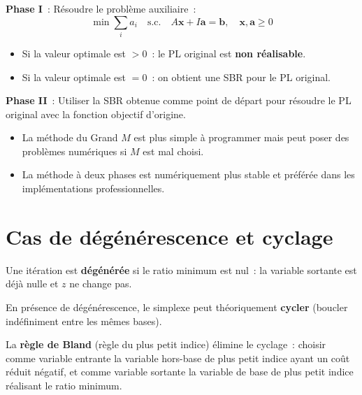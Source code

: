 \begin{algorithme}[title=\textbf{M\'ethode \`a deux phases}]
\textbf{Phase I}~: R\'esoudre le probl\`eme auxiliaire~:
\[
  \min \sum_{i} a_i \quad \text{s.c.} \quad
  A\mathbf{x} + I\mathbf{a} = \mathbf{b}, \quad
  \mathbf{x}, \mathbf{a} \ge 0
\]
\begin{itemize}
  \item Si la valeur optimale est $> 0$~: le PL original est \textbf{non
        r\'ealisable}.
  \item Si la valeur optimale est $= 0$~: on obtient une SBR pour le PL
        original.
\end{itemize}

\textbf{Phase II}~: Utiliser la SBR obtenue comme point de d\'epart pour
r\'esoudre le PL original avec la fonction objectif d'origine.
\end{algorithme}

\begin{bonnepratique}[title=\textbf{Grand $M$ vs.\ Deux phases}]
\begin{itemize}
  \item La m\'ethode du Grand $M$ est plus simple \`a programmer mais peut
        poser des probl\`emes num\'eriques si $M$ est mal choisi.
  \item La m\'ethode \`a deux phases est num\'eriquement plus stable et
        pr\'ef\'er\'ee dans les impl\'ementations professionnelles.
\end{itemize}
\end{bonnepratique}

\section{Cas de d\'eg\'en\'erescence et cyclage}

\begin{definition}[D\'eg\'en\'erescence]
Une it\'eration est \textbf{d\'eg\'en\'er\'ee} si le ratio minimum est nul~:
la variable sortante est d\'ej\`a nulle et $z$ ne change pas.
\end{definition}

\begin{theoreme}
En pr\'esence de d\'eg\'en\'erescence, le simplexe peut th\'eoriquement
\textbf{cycler} (boucler ind\'efiniment entre les m\^emes bases).
\end{theoreme}

\begin{definition}
La \textbf{r\`egle de Bland} (r\`egle du plus petit indice) \'elimine le
cyclage~: choisir comme variable entrante la variable hors-base de plus
petit indice ayant un co\^ut r\'eduit n\'egatif, et comme variable sortante
la variable de base de plus petit indice r\'ealisant le ratio minimum.
\end{definition}

